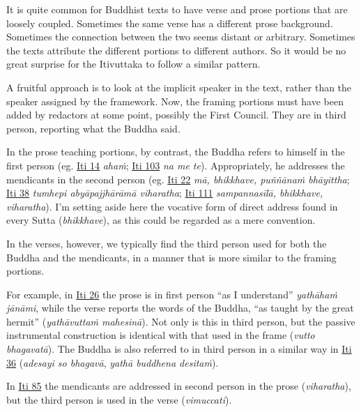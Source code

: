 \documentclass[12pt,openany]{book}%
\begin{document}
It is quite common for Buddhist texts to have verse and prose portions that are loosely coupled. Sometimes the same verse has a different prose background. Sometimes the connection between the two seems distant or arbitrary. Sometimes the texts attribute the different portions to different authors. So it would be no great surprise for the Itivuttaka to follow a similar pattern.

A fruitful approach is to look at the implicit speaker in the text, rather than the speaker assigned by the framework. Now, the framing portions must have been added by redactors at some point, possibly the First Council. They are in third person, reporting what the Buddha said.

In the prose teaching portions, by contrast, the Buddha refers to himself in the first person (eg. \href{https://suttacentral.net/iti14/en/sujato}{Iti 14} \emph{\textsanskrit{ahaṁ}}; \href{https://suttacentral.net/iti103/en/sujato}{Iti 103} \emph{na me te}). Appropriately, he addresses the mendicants in the second person (eg. \href{https://suttacentral.net/iti22/en/sujato}{Iti 22} \emph{\textsanskrit{mā}, bhikkhave, \textsanskrit{puññānaṁ} \textsanskrit{bhāyittha}}; \href{https://suttacentral.net/iti38/en/sujato}{Iti 38} \emph{tumhepi \textsanskrit{abyāpajjhārāmā} viharatha}; \href{https://suttacentral.net/iti111/en/sujato}{Iti 111} \emph{\textsanskrit{sampannasīlā}, bhikkhave, viharatha}). I’m setting aside here the vocative form of direct address found in every Sutta (\emph{bhikkhave}), as this could be regarded as a mere convention.

In the verses, however, we typically find the third person used for both the Buddha and the mendicants, in a manner that is more similar to the framing portions.

For example, in \href{https://suttacentral.net/iti26/en/sujato}{Iti 26} the prose is in first person “as I understand” \emph{\textsanskrit{yathāhaṁ} \textsanskrit{jānāmi}}, while the verse reports the words of the Buddha, “as taught by the great hermit” (\emph{\textsanskrit{yathāvuttaṁ} \textsanskrit{mahesinā}}). Not only is this in third person, but the passive instrumental construction is identical with that used in the frame (\emph{vutto \textsanskrit{bhagavatā}}). The Buddha is also referred to in third person in a similar way in \href{https://suttacentral.net/iti36/en/sujato}{Iti 36} (\emph{adesayi so \textsanskrit{bhagavā}}, \emph{\textsanskrit{yathā} buddhena \textsanskrit{desitaṁ}}).

In \href{https://suttacentral.net/iti85/en/sujato}{Iti 85} the mendicants are addressed in second person in the prose (\emph{viharatha}), but the third person is used in the verse (\emph{vimuccati}).
\end{document}
